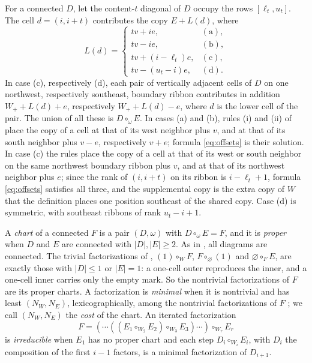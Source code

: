 \documentclass[11pt,a4paper]{amsart}
\numberwithin{equation}{section}
\theoremstyle{plain}
\theoremstyle{definition}
\begin{document}
For a connected \(D\), let the content-\(t\) diagonal of \(D\) occupy the rows \([\ell_t,u_t]\).  The cell \(d=(i,i+t)\) contributes the copy \(E+L(d)\), where
\begin{equation}\label{eq:offsets}
 L(d)=
 \begin{cases}
 tv+ie,&\mathrm{(a)},\\
 tv-ie,&\mathrm{(b)},\\
 tv+(i-\ell_t)e,&\mathrm{(c)},\\
 tv-(u_t-i)e,&\mathrm{(d)}.
 \end{cases}
\end{equation}
In case (c), respectively (d), each pair of vertically adjacent cells of \(D\) on one northwest, respectively southeast, boundary ribbon contributes in addition \(W_++L(d)+e\), respectively \(W_++L(d)-e\), where \(d\) is the lower cell of the pair.  The union of all these is \(D\circ_\omega E\).  In cases (a) and (b), rules (i) and (ii) of \cite[Def.~3.11]{McNamara2009Classification} place the copy of a cell at that of its west neighbor plus \(v\), and at that of its south neighbor plus \(v-e\), respectively \(v+e\); formula \eqref{eq:offsets} is their solution.  In case (c) the rules place the copy of a cell at that of its west or south neighbor on the same northwest boundary ribbon plus \(v\), and at that of its northwest neighbor plus \(e\); since the rank of \((i,i+t)\) on its ribbon is \(i-\ell_t+1\), formula \eqref{eq:offsets} satisfies all three, and the supplemental copy is the extra copy of \(W\) that the definition places one position southeast of the shared copy.  Case (d) is symmetric, with southeast ribbons of rank \(u_t-i+1\).

A \emph{chart} of a connected \(F\) is a pair \((D,\omega)\) with \(D\circ_\omega E=F\), and it is \emph{proper} when \(D\) and \(E\) are connected with \(|D|,|E|\ge2\).  As in \cite{McNamara2009Classification}, all diagrams are connected.  The trivial factorizations of \cite[Def.~5.5]{McNamara2009Classification}, \((1)\circ_WF\), \(F\circ_\varnothing(1)\) and \(\varnothing\circ_FE\), are exactly those with \(|D|\le1\) or \(|E|=1\): a one-cell outer reproduces the inner, and a one-cell inner carries only the empty mark.  So the nontrivial factorizations of \(F\) are its proper charts.  A factorization is \emph{minimal} when it is nontrivial and has least \((N_W,N_E)\), lexicographically, among the nontrivial factorizations of \(F\) \cite[Def.~5.5]{McNamara2009Classification}; we call \((N_W,N_E)\) the \emph{cost} of the chart.  An iterated factorization
\begin{equation}\label{eq:tower}
 F=(\cdots((E_1\circ_{W_2}E_2)\circ_{W_3}E_3)\cdots)\circ_{W_r}E_r
\end{equation}
is \emph{irreducible} when \(E_1\) has no proper chart and each step \(D_i\circ_{W_i}E_i\), with \(D_i\) the composition of the first \(i-1\) factors, is a minimal factorization of \(D_{i+1}\).
\end{document}
